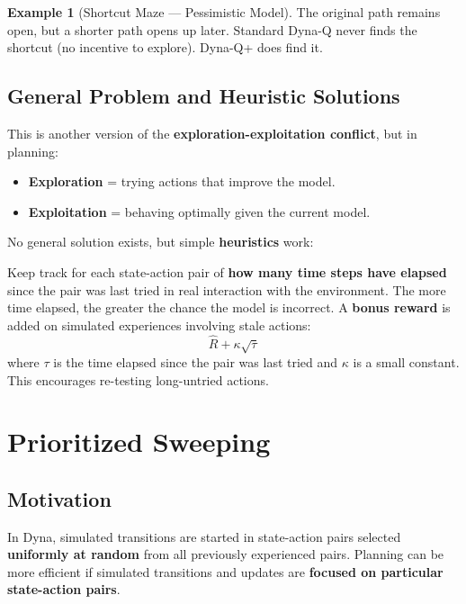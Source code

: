 \documentclass[11pt,a4paper]{article}
\theoremstyle{definition}
\newtheorem{example}{Example}[section]
\theoremstyle{plain}
\theoremstyle{remark}
\begin{document}
\begin{example}[Shortcut Maze — Pessimistic Model]
The original path remains open, but a shorter path opens up later. Standard Dyna-Q never finds the shortcut (no incentive to explore). Dyna-Q+ does find it.
\end{example}

\subsection{General Problem and Heuristic Solutions}

This is another version of the \textbf{exploration-exploitation conflict}, but in planning:
\begin{itemize}
    \item \textbf{Exploration} = trying actions that improve the model.
    \item \textbf{Exploitation} = behaving optimally given the current model.
\end{itemize}

No general solution exists, but simple \textbf{heuristics} work:

\begin{tcolorbox}[colback=blue!5!white, colframe=blue!60!black, title={Dyna-Q+}]
Keep track for each state-action pair of \textbf{how many time steps have elapsed} since the pair was last tried in real interaction with the environment. The more time elapsed, the greater the chance the model is incorrect. A \textbf{bonus reward} is added on simulated experiences involving stale actions:
\[
    \hat{R} + \kappa\sqrt{\tau}
\]
where $\tau$ is the time elapsed since the pair was last tried and $\kappa$ is a small constant. This encourages re-testing long-untried actions.
\end{tcolorbox}

\section{Prioritized Sweeping}

\subsection{Motivation}

In Dyna, simulated transitions are started in state-action pairs selected \textbf{uniformly at random} from all previously experienced pairs. Planning can be more efficient if simulated transitions and updates are \textbf{focused on particular state-action pairs}.
\end{document}
